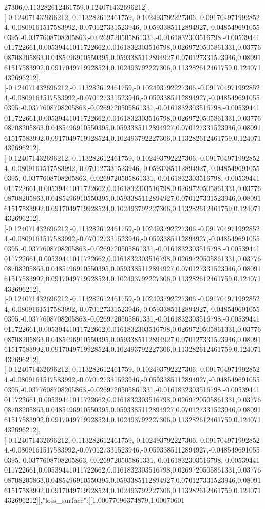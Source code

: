 \documentclass{article}
\begin{document}
27306,0.113282612461759,0.124071432696212],[-0.124071432696212,-0.113282612461759,-0.102493792227306,-0.0917049719928524,-0.0809161517583992,-0.070127331523946,-0.0593385112894927,-0.0485496910550395,-0.0377608708205863,-0.0269720505861331,-0.0161832303516798,-0.00539441011722661,0.00539441011722662,0.0161832303516798,0.0269720505861331,0.0377608708205863,0.0485496910550395,0.0593385112894927,0.070127331523946,0.0809161517583992,0.0917049719928524,0.102493792227306,0.113282612461759,0.124071432696212],[-0.124071432696212,-0.113282612461759,-0.102493792227306,-0.0917049719928524,-0.0809161517583992,-0.070127331523946,-0.0593385112894927,-0.0485496910550395,-0.0377608708205863,-0.0269720505861331,-0.0161832303516798,-0.00539441011722661,0.00539441011722662,0.0161832303516798,0.0269720505861331,0.0377608708205863,0.0485496910550395,0.0593385112894927,0.070127331523946,0.0809161517583992,0.0917049719928524,0.102493792227306,0.113282612461759,0.124071432696212],[-0.124071432696212,-0.113282612461759,-0.102493792227306,-0.0917049719928524,-0.0809161517583992,-0.070127331523946,-0.0593385112894927,-0.0485496910550395,-0.0377608708205863,-0.0269720505861331,-0.0161832303516798,-0.00539441011722661,0.00539441011722662,0.0161832303516798,0.0269720505861331,0.0377608708205863,0.0485496910550395,0.0593385112894927,0.070127331523946,0.0809161517583992,0.0917049719928524,0.102493792227306,0.113282612461759,0.124071432696212],[-0.124071432696212,-0.113282612461759,-0.102493792227306,-0.0917049719928524,-0.0809161517583992,-0.070127331523946,-0.0593385112894927,-0.0485496910550395,-0.0377608708205863,-0.0269720505861331,-0.0161832303516798,-0.00539441011722661,0.00539441011722662,0.0161832303516798,0.0269720505861331,0.0377608708205863,0.0485496910550395,0.0593385112894927,0.070127331523946,0.0809161517583992,0.0917049719928524,0.102493792227306,0.113282612461759,0.124071432696212],[-0.124071432696212,-0.113282612461759,-0.102493792227306,-0.0917049719928524,-0.0809161517583992,-0.070127331523946,-0.0593385112894927,-0.0485496910550395,-0.0377608708205863,-0.0269720505861331,-0.0161832303516798,-0.00539441011722661,0.00539441011722662,0.0161832303516798,0.0269720505861331,0.0377608708205863,0.0485496910550395,0.0593385112894927,0.070127331523946,0.0809161517583992,0.0917049719928524,0.102493792227306,0.113282612461759,0.124071432696212],[-0.124071432696212,-0.113282612461759,-0.102493792227306,-0.0917049719928524,-0.0809161517583992,-0.070127331523946,-0.0593385112894927,-0.0485496910550395,-0.0377608708205863,-0.0269720505861331,-0.0161832303516798,-0.00539441011722661,0.00539441011722662,0.0161832303516798,0.0269720505861331,0.0377608708205863,0.0485496910550395,0.0593385112894927,0.070127331523946,0.0809161517583992,0.0917049719928524,0.102493792227306,0.113282612461759,0.124071432696212],[-0.124071432696212,-0.113282612461759,-0.102493792227306,-0.0917049719928524,-0.0809161517583992,-0.070127331523946,-0.0593385112894927,-0.0485496910550395,-0.0377608708205863,-0.0269720505861331,-0.0161832303516798,-0.00539441011722661,0.00539441011722662,0.0161832303516798,0.0269720505861331,0.0377608708205863,0.0485496910550395,0.0593385112894927,0.070127331523946,0.0809161517583992,0.0917049719928524,0.102493792227306,0.113282612461759,0.124071432696212]],"loss_surface":[[1.00077096374879,1.00070601
\end{document}
